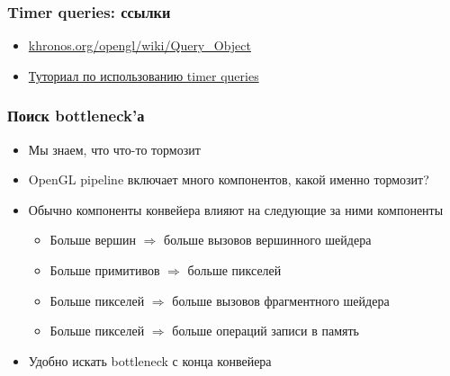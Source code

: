 \documentclass{beamer}
\begin{document}
\begin{frame}[fragile]
\frametitle{Timer queries: ссылки}
\begin{itemize}
\item \href{https://www.khronos.org/opengl/wiki/Query_Object}{khronos.org/opengl/wiki/Query\_Object}
\item \href{https://www.lighthouse3d.com/tutorials/opengl-timer-query}{Туториал по использованию timer queries}
\end{itemize}
\end{frame}

\begin{frame}[fragile]
\frametitle{Поиск bottleneck'а}
\begin{itemize}
\item Мы знаем, что что-то тормозит
\pause
\item OpenGL pipeline включает много компонентов, какой именно тормозит?
\pause
\item Обычно компоненты конвейера влияют на следующие за ними компоненты
\pause
\begin{itemize}
\item Больше вершин \begin{math}\Rightarrow\end{math} больше вызовов вершинного шейдера
\item Больше примитивов \begin{math}\Rightarrow\end{math} больше пикселей
\item Больше пикселей \begin{math}\Rightarrow\end{math} больше вызовов фрагментного шейдера
\item Больше пикселей \begin{math}\Rightarrow\end{math} больше операций записи в память
\end{itemize}
\pause
\item Удобно искать bottleneck с конца конвейера
\end{itemize}
\end{frame}
\end{document}
